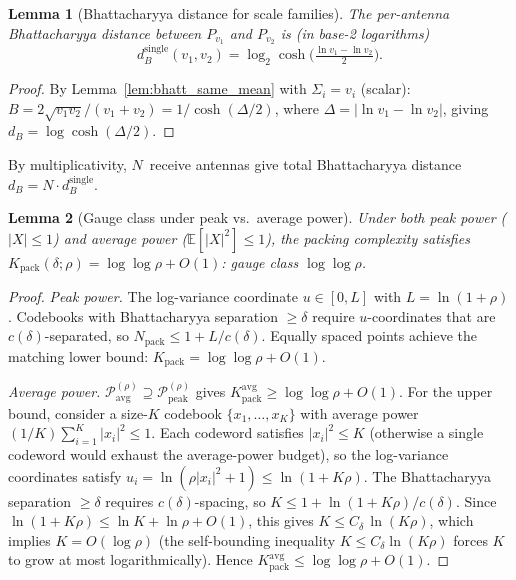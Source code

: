 \documentclass[lettersize,onecolumn]{IEEEtran}
\newtheorem{lemma}{Lemma}
\newcommand{\E}{\mathbb{E}}
\newcommand{\snr}{\rho}
\newcommand{\setP}{\mathcal{P}}
\begin{document}
\begin{lemma}[Bhattacharyya distance for scale families]
\label{lem:scale_bhatt}
The per-antenna Bhattacharyya distance between $P_{v_1}$ and
$P_{v_2}$ is (in base-2 logarithms)
\begin{equation}\label{eq:bhatt_scale}
d_B^{\mathrm{single}}(v_1,v_2) =
\log_2\cosh\!\big(\tfrac{\ln v_1 - \ln v_2}{2}\big).
\end{equation}
\end{lemma}
\begin{proof}
By Lemma~\ref{lem:bhatt_same_mean} with $\Sigma_i = v_i$ (scalar):
$B = 2\sqrt{v_1 v_2}/(v_1+v_2)
= 1/\cosh(\Delta/2)$,
where $\Delta = |\ln v_1 - \ln v_2|$, giving
$d_B = \log\cosh(\Delta/2)$.
\end{proof}

By multiplicativity, $N$~receive antennas give total Bhattacharyya
distance $d_B = N \cdot d_B^{\mathrm{single}}$.

\begin{lemma}[Gauge class under peak vs.\ average power]
\label{lem:constraint}
Under both peak power ($|X| \le 1$) and average power
($\E[|X|^2] \le 1$), the packing complexity satisfies
$K_{\mathrm{pack}}(\delta;\snr) = \log\log\snr + O(1)$: gauge
class $\log\log\snr$.
\end{lemma}
\begin{proof}
\emph{Peak power.}
The log-variance coordinate $u\in[0,L]$ with $L=\ln(1+\snr)$.
Codebooks with Bhattacharyya separation $\ge\delta$ require
$u$-coordinates that are $c(\delta)$-separated, so
$N_{\mathrm{pack}} \le 1+L/c(\delta)$. Equally spaced points
achieve the matching lower bound:
$K_{\mathrm{pack}} = \log\log\snr + O(1)$.

\emph{Average power.}
$\setP^{(\snr)}_{\mathrm{avg}} \supseteq
\setP^{(\snr)}_{\mathrm{peak}}$ gives
$K_{\mathrm{pack}}^{\mathrm{avg}} \ge \log\log\snr + O(1)$.
For the upper bound, consider a size-$K$ codebook
$\{x_1,\dots,x_K\}$ with average power
$(1/K)\sum_{i=1}^{K}|x_i|^2 \le 1$. Each codeword satisfies
$|x_i|^2 \le K$ (otherwise a single codeword would exhaust the
average-power budget), so the log-variance coordinates satisfy
$u_i = \ln(\snr|x_i|^2+1) \le \ln(1+K\snr)$.
The Bhattacharyya separation $\ge\delta$ requires
$c(\delta)$-spacing, so
$K \le 1 + \ln(1+K\snr)/c(\delta)$.
Since $\ln(1+K\snr) \le \ln K + \ln\snr + O(1)$, this gives
$K \le C_\delta\,\ln(K\snr)$, which implies
$K = O(\log\snr)$ (the self-bounding inequality
$K \le C_\delta\ln(K\snr)$ forces $K$ to grow at most
logarithmically). Hence
$K_{\mathrm{pack}}^{\mathrm{avg}} \le \log\log\snr + O(1)$.
\end{proof}
\end{document}
